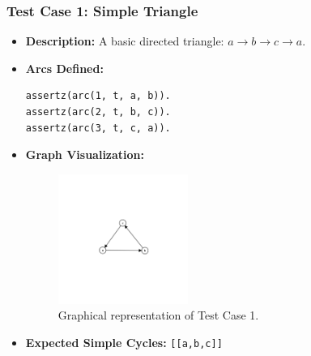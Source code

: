 \documentclass[12pt,a4paper]{article}
\begin{document}
\subsubsection{Test Case 1: Simple Triangle}
\begin{itemize}
\item \textbf{Description:} A basic directed triangle: $a \rightarrow b \rightarrow c \rightarrow a$. 
\item \textbf{Arcs Defined:}
\begin{lstlisting}[style=prologstyle, basicstyle=\ttfamily\footnotesize]
assertz(arc(1, t, a, b)).
assertz(arc(2, t, b, c)).
assertz(arc(3, t, c, a)).
\end{lstlisting}
\item \textbf{Graph Visualization:}
\begin{figure}[H]
\centering
\includegraphics[width=0.4\textwidth]{Test1.png} %
\caption{Graphical representation of Test Case 1.}
\label{fig:testcase1}
\end{figure}
\item \textbf{Expected Simple Cycles:} \texttt{[[a,b,c]]}
\end{itemize}
\end{document}
